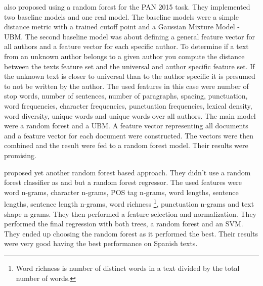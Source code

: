 \cite{pacheco2015} also proposed using a random forest for the PAN 2015 task.
They implemented two baseline models and one real model. The baseline models
were a simple distance metric with a trained cutoff point and a Gaussian Mixture
Model - \gls{UBM}. The second baseline model was about defining a general
feature vector for all authors and a feature vector for each specific author. To
determine if a text from an unknown author belongs to a given author you compute
the distance between the texts feature set and the universal and author specific
feature set. If the unknown text is closer to universal than to the author
specific it is presumed to not be written by the author. The used features in
this case were number of stop words, number of sentences, number of paragraphs,
spacing, punctuation, word frequencies, character frequencies, punctuation
frequencies, lexical density, word diversity, unique words and unique words
over all authors. The main model were a random forest and a \gls{UBM}. A feature
vector representing all documents and a feature vector for each document were
constructed. The vectors were then combined and the result were fed to a random
forest model. Their results were promising.

\cite{bartoli2015b} proposed yet another random forest based approach.
They didn't use a random forest classifier as \cite{maitra2015} and
\cite{pacheco2015} but a random forest regressor. The used features were word
n-grams, character n-grams, \gls{POS} tag n-grams, word lengths, sentence
lengths, sentence length n-grams, word richness \footnote{Word richness is
number of distinct words in a text divided by the total number of words.},
punctuation n-grams and text shape n-grams. They then performed a feature
selection and normalization. They performed the final regression with both
trees, a random forest and an SVM. They ended up choosing the random forest as
it performed the best. Their results were very good having the best performance
on Spanish texts.

